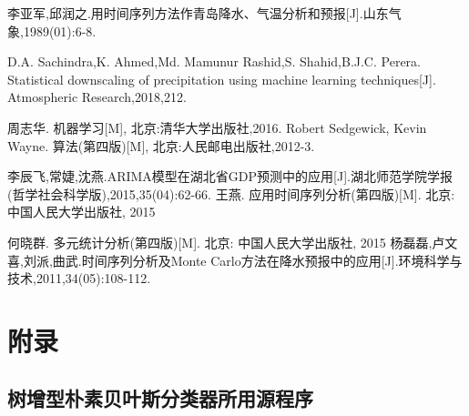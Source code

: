 \documentclass{ctexart}
\begin{document}
\begin{thebibliography}{1}
李亚军,邱润之.用时间序列方法作青岛降水、气温分析和预报[J].山东气象,1989(01):6-8.

D.A. Sachindra,K. Ahmed,Md. Mamunur Rashid,S. Shahid,B.J.C. Perera. Statistical downscaling of precipitation using machine learning techniques[J]. Atmospheric Research,2018,212.

周志华. 机器学习[M], 北京:清华大学出版社,2016.
 Robert Sedgewick, Kevin Wayne. 算法(第四版)[M], 北京:人民邮电出版社,2012-3.


李辰飞,常婕,沈燕.ARIMA模型在湖北省GDP预测中的应用[J].湖北师范学院学报(哲学社会科学版),2015,35(04):62-66.
王燕. 应用时间序列分析(第四版)[M]. 北京: 中国人民大学出版社, 2015


何晓群. 多元统计分析(第四版)[M]. 北京: 中国人民大学出版社, 2015
杨磊磊,卢文喜,刘派,曲武.时间序列分析及Monte Carlo方法在降水预报中的应用[J].环境科学与技术,2011,34(05):108-112.
\end{thebibliography}


\newpage
{}
\section*{附录}

\subsection*{树增型朴素贝叶斯分类器所用源程序}
\end{document}
